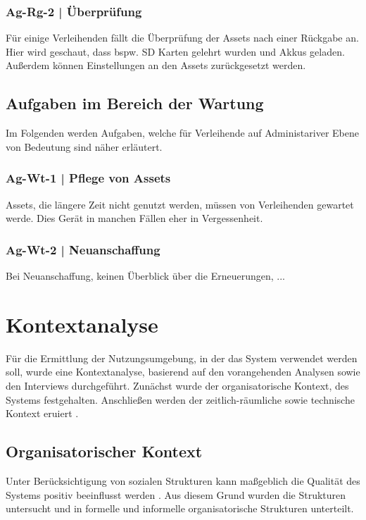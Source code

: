 \subsubsection{Ag-Rg-2 | Überprüfung}
Für einige Verleihenden fällt die Überprüfung der Assets nach einer Rückgabe an. Hier wird geschaut,
dass bspw. SD Karten gelehrt wurden und Akkus geladen. Außerdem können Einstellungen an den Assets
zurückgesetzt werden. 
\subsection{Aufgaben im Bereich der Wartung}
\label{subsec:wartung}
Im Folgenden werden Aufgaben, welche für Verleihende auf Administariver Ebene von Bedeutung sind
näher erläutert. 

\subsubsection{Ag-Wt-1 | Pflege von Assets}
\label{subsubsection:Ag-Wt-1}
Assets, die längere Zeit nicht genutzt werden, müssen von Verleihenden gewartet werde. Dies Gerät in
manchen Fällen eher in Vergessenheit. 

\subsubsection{Ag-Wt-2 | Neuanschaffung}
\label{subsubsection:Ag-Wt-2}
Bei Neuanschaffung, keinen Überblick über die Erneuerungen, ...



\section{Kontextanalyse}
\label{section:kontext}

Für die Ermittlung der Nutzungsumgebung, in der das System verwendet werden soll, wurde eine
Kontextanalyse, basierend auf den vorangehenden Analysen sowie den Interviews durchgeführt. Zunächst
wurde der organisatorische Kontext, des Systems festgehalten. Anschließen werden der
zeitlich-räumliche sowie technische Kontext eruiert \cite{herczeg_einfuhrung_2009}.

\subsection{Organisatorischer Kontext}
Unter Berücksichtigung von sozialen Strukturen kann maßgeblich die Qualität des Systems positiv
beeinflusst werden \cite{herczeg_einfuhrung_2009}. Aus diesem Grund wurden die Strukturen untersucht
und in formelle und informelle organisatorische Strukturen unterteilt.

